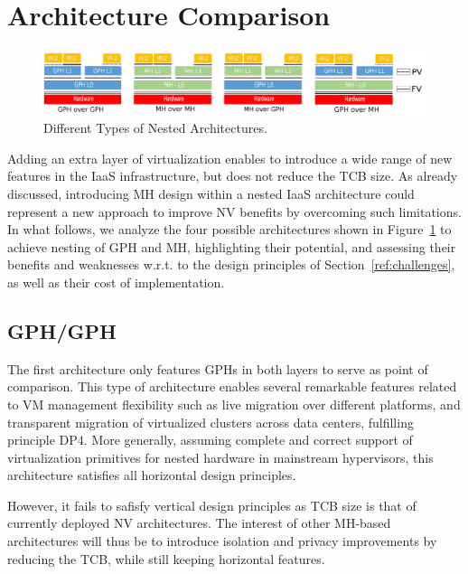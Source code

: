 \documentclass{sig-alternate}
\begin{document}
\section{Architecture Comparison}
\label{sec:archcomp}

\begin{figure}
\begin{center}
\includegraphics[width=2\columnwidth]{globalcut.png}
\end{center}
\caption{Different Types of Nested Architectures.}
\label{fig:io}
\end{figure}

\noindent Adding an extra layer of virtualization enables to introduce a wide range of new features in the IaaS infrastructure, but does not reduce the TCB size. As already discussed, introducing MH design within a nested IaaS architecture could represent a new approach to improve NV benefits by overcoming such limitations. In what follows, we analyze the four possible architectures shown in Figure~\ref{fig:io} to achieve nesting of GPH and MH, highlighting their potential, and assessing their benefits and weaknesses w.r.t. to the design principles of Section~\ref{ref:challenges}, as well as their cost of implementation.

\subsection{GPH/GPH}

\noindent The first architecture only features GPHs in both layers to serve as point of comparison. This type of architecture enables several remarkable features related to VM management flexibility such as live migration over different platforms, and transparent migration of virtualized clusters across data centers, fulfilling principle DP4. More generally, assuming complete and correct support of virtualization primitives for nested hardware in mainstream hypervisors, this architecture satisfies all horizontal design principles. 

However, it fails to safisfy vertical design principles as TCB size is that of currently deployed NV architectures. The interest of other MH-based architectures will thus be to introduce isolation and privacy improvements by reducing the TCB, while still keeping horizontal features.
\end{document}
